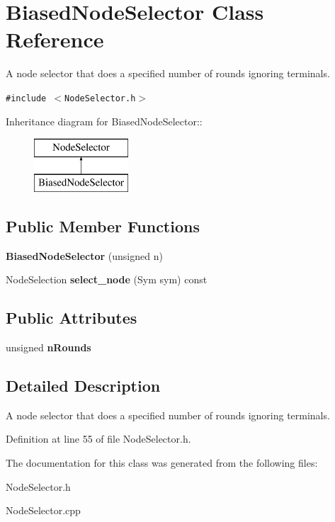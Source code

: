 \section{Biased\-Node\-Selector Class Reference}
\label{class_biased_node_selector}
A node selector that does a specified number of rounds ignoring terminals.  


{\tt \#include $<$Node\-Selector.h$>$}

Inheritance diagram for Biased\-Node\-Selector::\begin{figure}[H]
\begin{center}
\leavevmode
\includegraphics[height=2cm]{class_biased_node_selector}
\end{center}
\end{figure}
\subsection*{Public Member Functions}
\begin{CompactItemize}
\item 
{\bf Biased\-Node\-Selector} (unsigned n)\label{class_biased_node_selector_a1}

\item 
Node\-Selection {\bf select\_\-node} (Sym sym) const \label{class_biased_node_selector_a2}

\end{CompactItemize}
\subsection*{Public Attributes}
\begin{CompactItemize}
\item 
unsigned {\bf n\-Rounds}\label{class_biased_node_selector_o0}

\end{CompactItemize}


\subsection{Detailed Description}
A node selector that does a specified number of rounds ignoring terminals. 



Definition at line 55 of file Node\-Selector.h.

The documentation for this class was generated from the following files:\begin{CompactItemize}
\item 
Node\-Selector.h\item 
Node\-Selector.cpp\end{CompactItemize}

